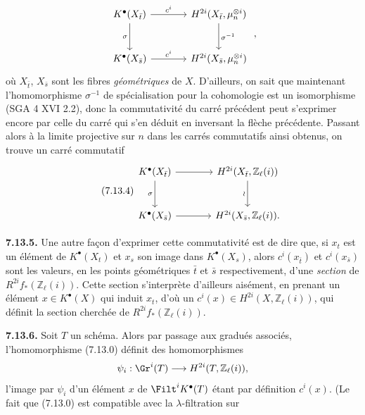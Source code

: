 
\[
\begin{tikzcd}[column sep=large,row sep=large]
K^\bullet(X_{\bar t}) \arrow[r,"c^i"] \arrow[d,"\sigma"'] &
H^{2i}(X_{\bar t},\mu_n^{\otimes i}) \arrow[d,"\sigma^{-1}"]\\
K^\bullet(X_{\bar s}) \arrow[r,"c^i"] &
H^{2i}(X_{\bar s},\mu_n^{\otimes i})
\end{tikzcd}
\;,
\]
où \(X_{\bar t}\), \(X_{\bar s}\)
sont les fibres \emph{géométriques} de \(X\). D'ailleurs, on sait que maintenant l'homomorphisme \(\sigma^{-1}\) de spécialisation pour la cohomologie est un isomorphisme (SGA 4 XVI 2.2), donc la commutativité du carré précédent peut s'exprimer encore par celle du carré qui s'en déduit en inversant la flèche précédente. Passant alors à la limite projective sur \(n\) dans les carrés commutatifs ainsi obtenus, on trouve un carré commutatif
\begin{equation}\tag{7.13.4}
\begin{tikzcd}[column sep=large,row sep=large]
K^\bullet(X_{\bar t}) \arrow[r] \arrow[d,"\sigma"'] &
H^{2i}(X_{\bar t},\mathbb Z_\ell(i)) \arrow[d,"\wr"']\\
K^\bullet(X_{\bar s}) \arrow[r] &
H^{2i}(X_{\bar s},\mathbb Z_\ell(i)).
\end{tikzcd}
\end{equation}

\textbf{7.13.5.} Une autre façon d'exprimer cette commutativité est de dire que, si \(x_t\) est un élément de \(K^\bullet(X_t)\) et \(x_s\) son image dans \(K^\bullet(X_s)\), alors \(c^i(x_{\bar t})\) et \(c^i(x_{\bar s})\) sont les valeurs, en les points géométriques \(\bar t\) et \(\bar s\) respectivement, d'une \emph{section} de \(R^{2i}f_*(\mathbb Z_\ell(i))\). Cette section s'interprète d'ailleurs aisément, en prenant un élément \(x\in K^\bullet(X)\) qui induit \(x_t\), d'où un \(c^i(x)\in H^{2i}(X,\mathbb Z_\ell(i))\), qui définit la section cherchée de \(R^{2i}f_*(\mathbb Z_\ell(i))\).

\textbf{7.13.6.} Soit \(T\) un schéma. Alors par passage aux gradués associés, l'homomorphisme (7.13.0) définit des homomorphismes
\[
  \psi_i:\Gr^i(T)\longrightarrow H^{2i}(T,\mathbb Z_\ell(i)),
\]
l'image par \(\psi_i\) d'un élément \(x\) de \(\Filt^iK^\bullet(T)\) étant par définition \(c^i(x)\). (Le fait que (7.13.0) est compatible avec la \(\lambda\)-filtration sur 

